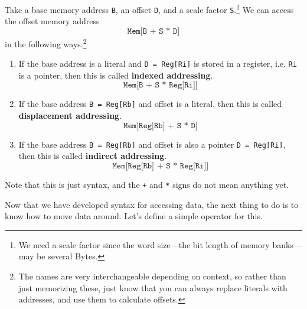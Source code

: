   \begin{definition}
    Take a base memory address \texttt{B}, an offset \texttt{D}, and a scale factor \texttt{S}.\footnote{We need a scale factor since the word size---the bit length of memory banks---may be several Bytes.} We can access the offset memory address 
    \begin{equation}
      \texttt{Mem[B + S * D]} 
    \end{equation}
    in the following ways.\footnote{The names are very interchangeable depending on context, so rather than just memorizing these, just know that you can always replace literals with addresses, and use them to calculate offsets.}
    \begin{enumerate}
      \item If the base address is a literal and \texttt{D = Reg[Ri]} is stored in a register, i.e. \texttt{Ri} is a pointer, then this is called \textbf{indexed addressing}. 
        \begin{equation}
          \texttt{Mem[B + S * Reg[Ri]]}
        \end{equation}

      \item If the base address \texttt{B = Reg[Rb]} and offset is a literal, then this is called \textbf{displacement addressing}. 
        \begin{equation}
          \texttt{Mem[Reg[Rb] + S * D]}
        \end{equation}

      \item If the base address \texttt{B = Reg[Rb]} and offset is also a pointer \texttt{D = Reg[Ri]}, then this is called \textbf{indirect addressing}. 
      \begin{equation}
        \texttt{Mem[Reg[Rb] + S * Reg[Ri]]}
      \end{equation}
    \end{enumerate}
  \end{definition}

  Note that this is just syntax, and the \texttt{+} and \texttt{*} signs do not mean anything yet. 

  Now that we have developed syntax for accessing data, the next thing to do is to know how to move data around. Let's define a simple operator for this. 

